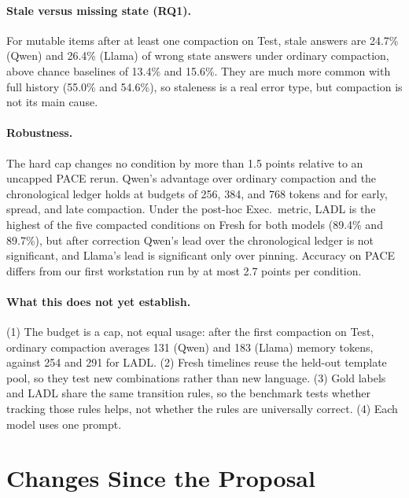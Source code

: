 \documentclass[11pt]{article}
\newcommand{\ours}{\textsc{LADL}\xspace}
\begin{document}
\paragraph{Stale versus missing state (RQ1).} For mutable items after at least one compaction on Test, stale answers are 24.7\% (Qwen) and 26.4\% (Llama) of wrong state answers under ordinary compaction, above chance baselines of 13.4\% and 15.6\%. They are much more common with full history (55.0\% and 54.6\%), so staleness is a real error type, but compaction is not its main cause.

\paragraph{Robustness.} The hard cap changes no condition by more than 1.5 points relative to an uncapped PACE rerun. Qwen's advantage over ordinary compaction and the chronological ledger holds at budgets of 256, 384, and 768 tokens and for early, spread, and late compaction. Under the post-hoc Exec.\ metric, \ours is the highest of the five compacted conditions on Fresh for both models (89.4\% and 89.7\%), but after correction Qwen's lead over the chronological ledger is not significant, and Llama's lead is significant only over pinning. Accuracy on PACE differs from our first workstation run by at most 2.7 points per condition.

\paragraph{What this does not yet establish.} (1) The budget is a cap, not equal usage: after the first compaction on Test, ordinary compaction averages 131 (Qwen) and 183 (Llama) memory tokens, against 254 and 291 for \ours. (2) Fresh timelines reuse the held-out template pool, so they test new combinations rather than new language. (3) Gold labels and \ours share the same transition rules, so the benchmark tests whether tracking those rules helps, not whether the rules are universally correct. (4) Each model uses one prompt.

\section{Changes Since the Proposal}
\end{document}
